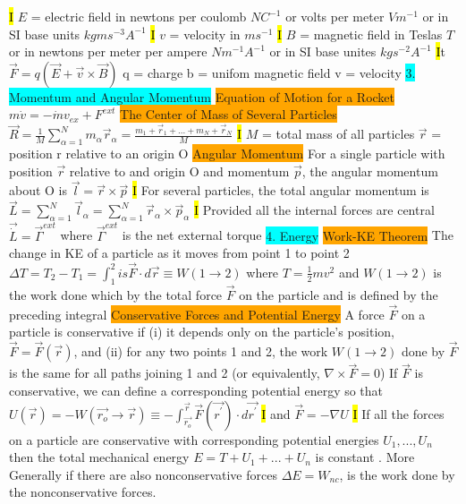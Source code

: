 \documentclass[10pt, oneside]{article}   	%
\begin{document}
\hl{I}
$E$ = electric field in newtons per coulomb $NC^{-1}$ or volts  per meter $Vm^{-1}$ or in SI base units $kgms^{-3}A^{-1}$
\hl{I}
$v$ = velocity in $ms^{-1}$
\hl{I}
$B$ = magnetic field in Teslas $T$ or in newtons per meter per ampere $Nm^{-1}A^{-1}$ or in SI base unites $kgs^{-2}A^{-1}$
\hl{I}t
$\vec{F}=q(\vec{E}+\vec{v}\times \vec{B})$
q = charge b = unifom magnetic field v = velocity 
\colorbox{Cyan}{3. Momentum and Angular Momentum}
\colorbox{Orange}{Equation of Motion for a Rocket}
$m\dot{v}=-\dot{m}v_{ex} + F^{ext}$
\colorbox{Orange}{The Center of Mass of Several Particles}
$\vec{R} = \frac{1}{M} \sum_{\alpha=1}^{N} m_{\alpha}\vec{r}_{\alpha} = \frac{m_1 +\vec{r}_1+...+m_N +\vec{r}_N}{M}$
\hl{I}
$M$ = total mass of all particles $\vec{r}$ = position r relative to an origin O
\colorbox{Orange}{Angular Momentum}
 For a single particle with position $\vec{r}$ relative to and origin O and momentum $\vec{p}$, the angular momentum about O is $\vec{l}=\vec{r}\times \vec{p}$
\hl{I}
For several particles, the total angular momentum is $\vec{L} = \sum_{\alpha=1}^{N} \vec{l}_{\alpha} = \sum_{\alpha=1}^{N} \vec{r}_{\alpha} \times  \vec{p}_{\alpha} $  
\hl{I}
Provided all the internal forces are central $\vec{\dot{L}}=\vec{\Gamma}^{ext}$ where $\vec{\Gamma}^{ext}$ is the net external torque
\colorbox{Cyan}{4. Energy}
\colorbox{Orange}{Work-KE Theorem} 
The change in KE of a particle as it moves from point 1 to point 2 $\Delta T = T_2 - T_1 = \int_1^2 is \vec{F}\cdot d\vec{r} \equiv W(1\rightarrow2)$ where $T=\frac{1}{2}mv^2$ and $W(1\rightarrow2)$ is the work done which by the total force $\vec{F}$ on the particle and is defined by the preceding integral
\colorbox{Orange}{Conservative Forces and Potential Energy} 
A force $\vec{F}$ on a particle is conservative if (i) it depends only on the particle's position, $\vec{F}=\vec{F}(\vec{r})$, and (ii) for any two points 1 and 2, the work $W(1\rightarrow2)$  done by $\vec{F}$ is the same for all paths joining 1 and 2 (or equivalently, $\nabla \times \vec{F} = 0$) If $\vec{F}$ is conservative, we can define a corresponding potential energy so that $U(\vec{r})= -W(\vec{r_o} \rightarrow \vec{r}) \equiv - \int_{\vec{r_o}}^{\vec{r}} \vec{F}(\vec{r^{\prime}}) \cdot d\vec{r^{\prime}}$
\hl{I}
and $\vec{F} = -\nabla U$
\hl{I}
If all the forces on a particle are conservative with corresponding potential energies $U_1, ... , U_n$ then the total mechanical energy $E = T + U_1+ ... + U_n$ is constant  . More Generally if there are also nonconservative forces $\Delta E = W_{nc}$, is the work done by the nonconservative forces.
\end{document}
